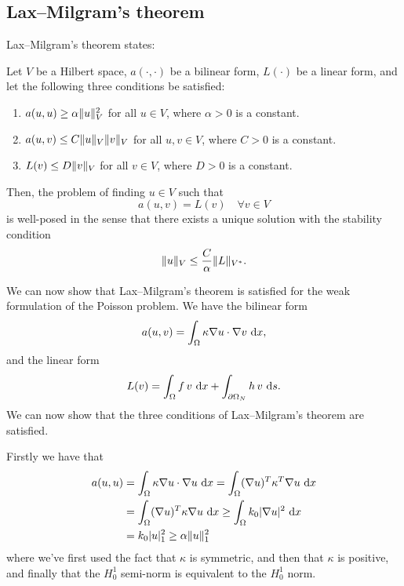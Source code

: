 \subsection{Lax--Milgram's theorem} %
Lax--Milgram's theorem states: %
\begin{theorem}
    Let $V$ be a Hilbert space, $a(\cdot, \cdot)$ be a bilinear form, $L(\cdot)$ be a linear form, and let the following three conditions be satisfied:
    \begin{enumerate}
        \item $a(u, u) \geq \alpha \lVert u\rVert_V^2$ for all $u \in V$, where $\alpha > 0$ is a constant.

        \item $a(u, v) \leq C \lVert u\rVert_V \lVert v\rVert_V$ for all $u, v \in V$, where $C > 0$ is a constant.

        \item $L(v) \leq D \lVert v\rVert_V$ for all $v \in V$, where $D > 0$ is a constant.
    \end{enumerate}
    Then, the problem of finding $u \in V$ such that
    \begin{equation}
        a(u, v) = L(v) \quad \forall v \in V
    \end{equation}
    is well-posed in the sense that there exists a unique solution with the stability condition
    \begin{equation}
        \lVert u\rVert_V \leq \frac{C}{\alpha} \lVert L\rVert_{V^*}.
    \end{equation}
\end{theorem}

We can now show that Lax--Milgram's theorem is satisfied for the weak formulation of the Poisson problem. %
We have the bilinear form
\begin{equation}
    a(u, v) = \int_\Omega \kappa \nabla u \cdot \nabla v \, \mathop{}\!\mathrm{d} x,
\end{equation}
and the linear form
\begin{equation}
    L(v) = \int_\Omega f \, v \, \mathop{}\!\mathrm{d} x + \int_{\partial\Omega_N} h \, v \, \mathop{}\!\mathrm{d} s.
\end{equation}
We can now show that the three conditions of Lax--Milgram's theorem are satisfied. %

Firstly we have that
\begin{align*}
    a(u, u)
    &= \int_\Omega \kappa \nabla u \cdot \nabla u \, \mathop{}\!\mathrm{d} x
    = \int_\Omega (\nabla u)^T \kappa^T \nabla u \, \mathop{}\!\mathrm{d} x \\
    &= \int_\Omega (\nabla u)^T \kappa \nabla u \, \mathop{}\!\mathrm{d} x
    \geq \int_\Omega k_0 \lvert\nabla u\rvert^2 \, \mathop{}\!\mathrm{d} x \\
    &= k_0 \lvert u\rvert^2_1
    \geq \alpha \lVert u\rVert_1^2
\end{align*}
where we've first used the fact that $\kappa$ is symmetric, and then that $\kappa$ is positive, and finally that the $H^1_0$ semi-norm is equivalent to the $H^1_0$ norm.

